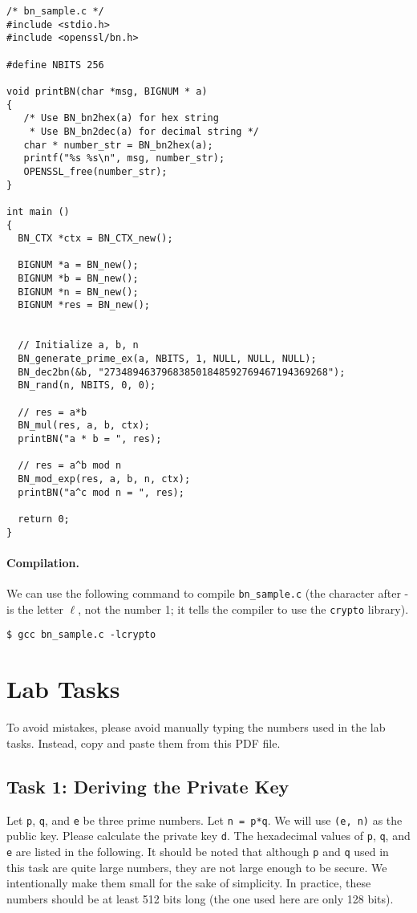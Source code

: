 \begin{lstlisting}
/* bn_sample.c */
#include <stdio.h>
#include <openssl/bn.h>

#define NBITS 256

void printBN(char *msg, BIGNUM * a)
{
   /* Use BN_bn2hex(a) for hex string
    * Use BN_bn2dec(a) for decimal string */
   char * number_str = BN_bn2hex(a);
   printf("%s %s\n", msg, number_str);
   OPENSSL_free(number_str);
}

int main ()
{
  BN_CTX *ctx = BN_CTX_new();

  BIGNUM *a = BN_new();
  BIGNUM *b = BN_new();
  BIGNUM *n = BN_new();
  BIGNUM *res = BN_new();


  // Initialize a, b, n
  BN_generate_prime_ex(a, NBITS, 1, NULL, NULL, NULL);
  BN_dec2bn(&b, "273489463796838501848592769467194369268");
  BN_rand(n, NBITS, 0, 0);

  // res = a*b
  BN_mul(res, a, b, ctx);
  printBN("a * b = ", res);

  // res = a^b mod n
  BN_mod_exp(res, a, b, n, ctx);
  printBN("a^c mod n = ", res);

  return 0;
}
\end{lstlisting}



\paragraph{Compilation.} We can use the following command to
compile \texttt{bn\_sample.c} (the
character after - is the letter $\ell$, not the number 1; it tells the compiler to use the
\texttt{crypto} library).

\begin{lstlisting}
$ gcc bn_sample.c -lcrypto
\end{lstlisting}



\section{Lab Tasks}


To avoid mistakes, please avoid manually typing the numbers used in the lab tasks. 
Instead, copy and paste them from this PDF file. 


\subsection{Task 1: Deriving the Private Key}

Let \texttt{p}, \texttt{q}, and \texttt{e} be three prime numbers. Let \texttt{n = p*q}.
We will use \texttt{(e, n)} as the public key. Please calculate the private key \texttt{d}.
The hexadecimal values of \texttt{p}, \texttt{q}, and \texttt{e} are listed in the following. It should be
noted that although \texttt{p} and \texttt{q} used in this task are quite large numbers, they are not large
enough to be secure. We intentionally make them small for the sake of simplicity. In practice,
these numbers should be at least 512 bits long (the one used here are only 128 bits).

